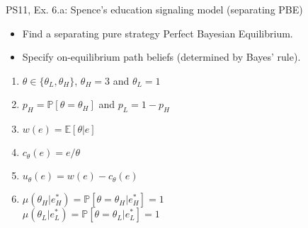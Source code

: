 \begin{frame}{PS11, Ex. 6.a: Spence’s education signaling model (separating PBE)}
    \begin{itemize}
      \item[(a)] Find a separating pure strategy Perfect Bayesian Equilibrium.
    \end{itemize}\vspace{-8pt}
    \begin{multicols}{2}
      \begin{itemize}
        \item[Step 1:] Specify on-equilibrium path beliefs (determined by Bayes' rule).
      \end{itemize}
      \vfill\null\columnbreak
      \begin{enumerate}
        \item[Types:] $\theta\in\{\theta_L,\theta_H\}$, $\theta_H=3$ and $\theta_L=1$
        \item[Prob.:] $p_H=\mathbb{P}[\theta=\theta_H]$ and $p_L=1-p_H$
        \item[Wage:] $w(e)=\mathbb{E}[\theta|e]$
        \item[Cost:] $c_\theta(e)=e/\theta$
        \item[Utility:] $u_\theta(e)=w(e)-c_\theta(e)$
        \item $\mu\left(\theta_H|e_H^*\right)=
               \mathbb{P}\left[\theta=\theta_H|e_H^*\right]=1$\\
              $\mu\left(\theta_L|e_L^*\right)=
               \mathbb{P}\left[\theta=\theta_L|e_L^*\right]=1$
      \end{enumerate}
    \end{multicols}
    \vfill\null
\end{frame}
